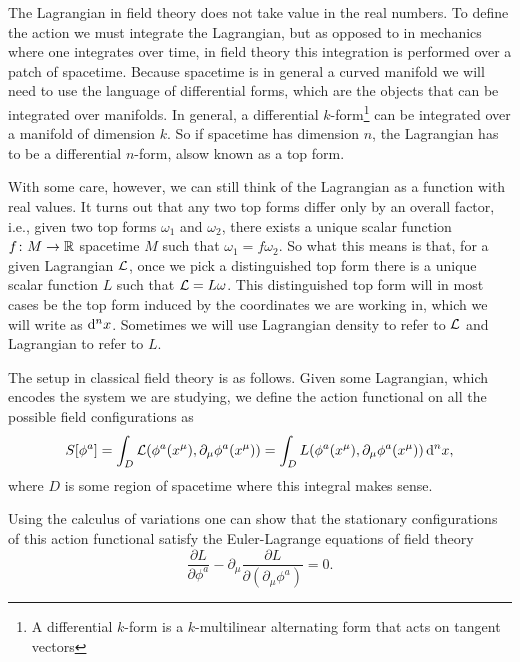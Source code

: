 \documentclass[../main.tex]{subfiles}
\begin{document}
The Lagrangian in field theory does not take value in the real numbers. To define the
action we must integrate the Lagrangian, but as opposed to in mechanics where one
integrates over time, in field theory this integration is performed over a patch of
spacetime. Because spacetime is in general a curved manifold we will need to use the
language of differential forms, which are the objects that can be integrated over
manifolds. In general, a differential \( k \)-form\footnote{A differential \( k \)-form is
a \( k \)-multilinear alternating form that acts on tangent vectors} can be integrated
over a manifold of dimension \( k \). So if spacetime has dimension \( n \), the
Lagrangian has to be a differential \( n \)-form, alsow known as a top form. 

With some care, however, we can still think of the Lagrangian as a function with real
values.  It turns out that any two top forms differ only by an overall factor, i.e., given
two top forms \( \omega_1 \) and \( \omega_2 \), there exists a unique scalar function \(
f \colon M \to \mathbb{R} \) spacetime \( M \) such that \( \omega_1 = f\omega_2 \). So what this
means is that, for a given Lagrangian \( \mathcal{L} \), once we pick a distinguished
top form there is a unique scalar function \( L \) such that \( \mathcal{L} = L \omega \). This
distinguished top form will in most cases be the top form induced by the coordinates we
are working in, which we will write as \( \mathrm{d}^nx \). Sometimes we will use Lagrangian
density to refer to \( \mathcal{L} \) and Lagrangian to refer to \( L \). 

The setup in classical field theory is as follows. Given some Lagrangian, which encodes
the system we are studying, we define the action functional on all the possible field
configurations as 
\begin{equation*}
	S[\phi^a] = \int_D \mathcal{L}(\phi^a(x^\mu), \partial_\mu \phi^a(x^\mu)) = \int_D
	L(\phi^a(x^\mu), \partial_\mu \phi^a(x^\mu)) \,\mathrm{d}^n x,
\end{equation*}
where \( D \) is some region of spacetime where this integral makes sense. 

Using the calculus of variations one can show that the stationary configurations of this
action functional satisfy the Euler-Lagrange equations of field theory
\begin{equation*}
	\frac{\partial L}{\partial \phi^a} - \partial_\mu \frac{\partial L}{\partial
	(\partial_\mu \phi ^a)} = 0. 
\end{equation*}
\end{document}
